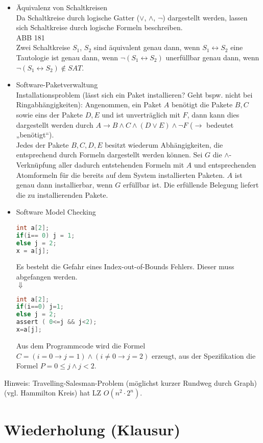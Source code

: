 \begin{itemize}
\item Äquivalenz von Schaltkreisen\\
Da Schaltkreise durch logische Gatter ($\vee$, $\wedge$, $\neg$) dargestellt werden, lassen sich Schaltkreise durch logische Formeln beschreiben.\\
ABB 181\\
Zwei Schaltkreise $S_1$, $S_2$ sind äquivalent genau dann, wenn $S_1\leftrightarrow S_2$ eine Tautologie ist genau dann, wenn $\neg(S_1 \leftrightarrow S_2)$ unerfüllbar genau dann, wenn $\neg (S_1\leftrightarrow S_2) \not \in SAT$.
\item Software-Paketverwaltung\\
Installationsproblem (lässt sich ein Paket installieren? Geht bspw. nicht bei Ringabhängigkeiten): Angenommen, ein Paket $A$ benötigt die Pakete $B,C$ sowie eins der Pakete $D,E$ und ist unverträglich mit $F$, dann kann dies dargestellt werden durch $A \to B \wedge C \wedge (D \vee E) \wedge \neg F$ ($\to$ bedeutet „benötigt“).\\
Jedes der Pakete $B,C,D,E$ besitzt wiederum Abhängigkeiten, die entsprechend durch Formeln dargestellt werden können. Sei $G$ die $\wedge$-Verknüpfung aller dadurch entstehenden Formeln mit $A$ und entsprechenden Atomformeln für die bereits auf dem System installierten Paketen. $A$ ist genau dann installierbar, wenn $G$ erfüllbar ist. Die erfüllende Belegung liefert die zu installierenden Pakete.
\item Software Model Checking
\begin{lstlisting}[language=C]
int a[2];
if(i== 0) j = 1;
else j = 2;
x = a[j];
\end{lstlisting}
Es besteht die Gefahr eines Index-out-of-Bounds Fehlers. Dieser muss abgefangen werden.\\
$\Downarrow$
\begin{lstlisting}[language=C]
int a[2];
if(i==0) j=1;
else j = 2;
assert ( 0<=j && j<2);
x=a[j];
\end{lstlisting}
Aus dem Programmcode wird die Formel $C=(i=0 \to j=1)\wedge ( i \not = 0 \to j = 2)$ erzeugt, aus der Spezifikation die Formel $P=0\leq j \wedge j <2$.
\end{itemize}


Hinweis: Travelling-Salesman-Problem (möglichst kurzer Rundweg durch Graph) (vgl. Hammilton Kreis) hat LZ $O(n^2\cdot 2^n)$.

\section{Wiederholung (Klausur)}
